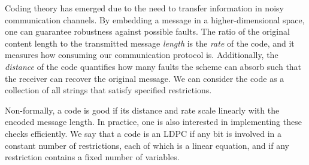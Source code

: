%  
%
%
%
%

Coding theory has emerged due to the need to transfer information in noisy communication channels. By embedding a message in a higher-dimensional space, one can guarantee robustness against possible faults. The ratio of the original content length to the transmitted message \emph{length} is the \emph{rate} of the code, and it measures how consuming our communication protocol is. Additionally, the \emph{distance} of the code quantifies how many faults the scheme can absorb such that the receiver can recover the original message. We can consider the code as a collection of all strings that satisfy specified restrictions.

Non-formally, a code is good if its distance and rate scale linearly with the encoded message length. In practice, one is also interested in implementing these checks efficiently. We say that a code is an LDPC if any bit is involved in a constant number of restrictions, each of which is a linear equation, and if any restriction contains a fixed number of variables.

